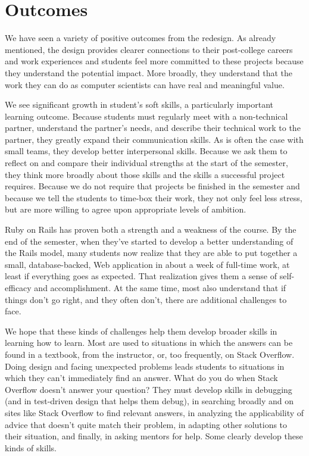 \section{Outcomes}

We have seen a variety of positive outcomes from the redesign.  As
already mentioned, the design provides clearer connections to their
post-college careers and work experiences and students feel more
committed to these projects because they understand the potential
impact.  More broadly, they understand that the work they can do
as computer scientists can have real and meaningful value.

We see significant growth in student's soft skills, a particularly
important learning outcome.
Because students must regularly meet with a
non-technical partner, understand the partner's needs, and
describe their technical work to the partner,
they greatly expand their communication skills.
As is often the case with small teams, they develop better interpersonal
skills.  Because we ask them to reflect on and compare their individual
strengths at the start of the semester,
they think more broadly
about those skills and the skills a successful
project requires.  
Because we do
not require that projects be finished in the semester and because
we tell the students to time-box their work, they not only feel
less stress, but are more willing to agree upon appropriate levels
of ambition. 

Ruby on Rails has proven both a strength and a weakness
of the course.  By the end of the semester, when they've started to develop
a better understanding of the Rails model, many students now realize that they 
are able to put together a small, database-backed, Web application
in about a week of full-time work, at least if everything goes as
expected.  
That realization gives them a sense of self-efficacy
and accomplishment.  At the same time, most also understand that if things
don't go right, and they often don't, there are additional challenges
to face.

We hope that these kinds of challenges help them develop broader
skills in learning how to learn.  Most are used to situations in
which the answers can be found in a textbook, from the instructor,
or, too frequently, on Stack Overflow.  Doing design and facing 
unexpected problems leads students to situations in
which they can't immediately find an answer.  What do you do when
Stack Overflow doesn't answer your question?  They must develop skills
in debugging (and in test-driven design that helps them
debug), in searching broadly and on sites like Stack Overflow
to find relevant answers, in analyzing the applicability of advice
that doesn't quite match their problem, in adapting other
solutions to their situation, and finally, in asking mentors for help.
Some clearly develop these kinds of skills.  

